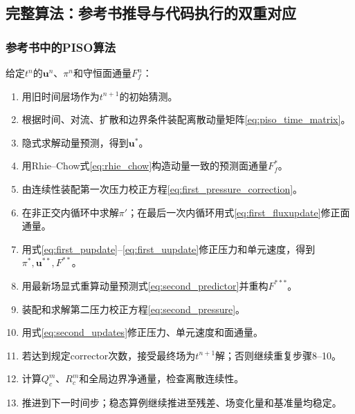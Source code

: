 \documentclass[UTF8,12pt,a4paper]{ctexart}
\numberwithin{equation}{section}
\begin{document}
\subsection{完整算法：参考书推导与代码执行的双重对应}
\subsubsection{参考书中的PISO算法}
给定$t^n$的$\bm u^n$、$\pi^n$和守恒面通量$F_f^n$：
\begin{enumerate}
  \item 用旧时间层场作为$t^{n+1}$的初始猜测。
  \item 根据时间、对流、扩散和边界条件装配离散动量矩阵\eqref{eq:piso_time_matrix}。
  \item 隐式求解动量预测，得到$\bm u^*$。
  \item 用Rhie--Chow式\eqref{eq:rhie_chow}构造动量一致的预测面通量$F_f^*$。
  \item 由连续性装配第一次压力校正方程\eqref{eq:first_pressure_correction}。
  \item 在非正交内循环中求解$\pi'$；在最后一次内循环用式\eqref{eq:first_fluxupdate}修正面通量。
  \item 用式\eqref{eq:first_pupdate}--\eqref{eq:first_uupdate}修正压力和单元速度，得到$\pi^*,\bm u^{**},F^{**}$。
  \item 用最新场显式重算动量预测式\eqref{eq:second_predictor}并重构$F^{***}$。
  \item 装配和求解第二压力校正方程\eqref{eq:second_pressure}。
  \item 用式\eqref{eq:second_updates}修正压力、单元速度和面通量。
  \item 若达到规定corrector次数，接受最终场为$t^{n+1}$解；否则继续重复步骤8--10。
  \item 计算$Q_c^m$、$R_c^m$和全局边界净通量，检查离散连续性。
  \item 推进到下一时间步；稳态算例继续推进至残差、场变化量和基准量均稳定。
\end{enumerate}
\end{document}
